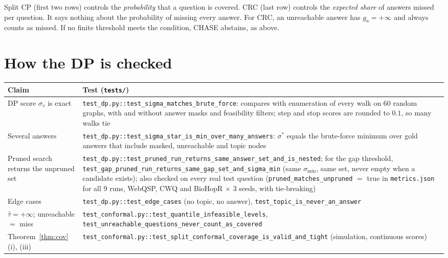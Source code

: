 \documentclass[11pt,a4paper]{article}
\theoremstyle{definition}
\theoremstyle{remark}
\newcommand{\tauhat}{\hat{\tau}}
\newcommand{\method}{\textsc{CHASE}}
\newcommand{\code}[1]{\texttt{#1}}
\begin{document}
\noindent Split CP (first two rows) controls the \emph{probability} that a question is covered. CRC (last row) controls the \emph{expected share} of answers missed per question. It says nothing about the probability of missing every answer. For CRC, an unreachable answer has $g_a=+\infty$ and always counts as missed. If no finite threshold meets the condition, \method{} abstains, as above.

\section{How the DP is checked}

\begin{center}
\begin{tabularx}{\textwidth}{@{}>{\raggedright\arraybackslash}p{5cm}X@{}}
\toprule
Claim & Test (\code{tests/})\\
\midrule
DP score $\sigma_v$ is exact & \code{test\_dp.py::test\_sigma\_matches\_brute\_force}: compares with enumeration of every walk on 60 random graphs, with and without answer masks and feasibility filters; step and stop scores are rounded to $0.1$, so many walks tie\\
Several answers & \code{test\_dp.py::test\_sigma\_star\_is\_min\_over\_many\_answers}: $\sigma^*$ equals the brute-force minimum over gold answers that include masked, unreachable and topic nodes\\
Pruned search returns the unpruned set & \code{test\_dp.py::test\_pruned\_run\_returns\_same\_answer\_set\_and\_is\_nested}; for the gap threshold, \code{test\_gap\_pruned\_run\_returns\_same\_gap\_set\_and\_sigma\_min} (same $\sigma_{\min}$, same set, never empty when a candidate exists); also checked on every real test question (\code{pruned\_matches\_unpruned} $=$ true in \code{metrics.json} for all 9 runs, WebQSP, CWQ and BioHopR $\times$ 3 seeds, with tie-breaking)\\
Edge cases & \code{test\_dp.py::test\_edge\_cases} (no topic, no answer), \code{test\_topic\_is\_never\_an\_answer}\\
$\tauhat=+\infty$; unreachable $=$ miss & \code{test\_conformal.py::test\_quantile\_infeasible\_levels}, \code{test\_unreachable\_questions\_never\_count\_as\_covered}\\
Theorem~\ref{thm:cov} (i), (iii) & \code{test\_conformal.py::test\_split\_conformal\_coverage\_is\_valid\_and\_tight} (simulation, continuous scores)\\

\end{tabularx}
\end{center}
\end{document}
